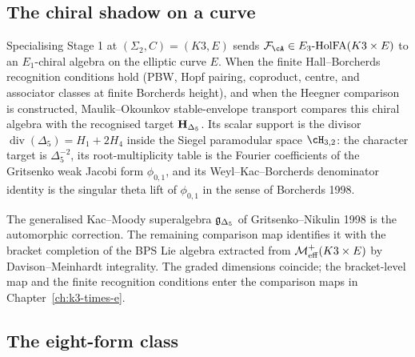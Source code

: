 \subsection{The chiral shadow on a curve}
\label{wn:sec:platonic-intro-chiral-shadow}

Specialising Stage 1 at $(\Sigma_2, C) = (K3, E)$ sends
$\cF_\cA \in E_3\text{-}\HolFA(K3 \times E)$ to an $E_1$-chiral
algebra on the elliptic curve $E$. When the finite Hall--Borcherds
recognition conditions hold (PBW, Hopf pairing, coproduct, centre, and associator
classes at finite Borcherds height), and when the Heegner comparison is
constructed, Maulik--Okounkov stable-envelope transport compares this
chiral algebra with the recognised target $\mathbf{H}_{\Delta_5}$. Its scalar
support is the divisor
$\operatorname{div}(\Delta_5)=H_1+2H_4$ inside the Siegel paramodular
space $\cH_{3,2}$: the character target is $\Delta_5^{-2}$, its
root-multiplicity table is the Fourier coefficients of the Gritsenko
weak Jacobi form $\phi_{0,1}$, and its Weyl--Kac--Borcherds denominator
identity is the singular theta lift of $\phi_{0,1}$ in the sense of
Borcherds 1998.

The generalised Kac--Moody superalgebra $\mathfrak{g}_{\Delta_5}$ of
Gritsenko--Nikulin 1998 is the automorphic correction. The remaining
comparison map identifies it with the bracket completion of the BPS Lie
algebra extracted from $\mathcal{M}^{+}_{\mathrm{eff}}(K3 \times E)$ by Davison--Meinhardt
integrality. The graded dimensions coincide; the bracket-level map and
the finite recognition conditions enter the comparison maps in
Chapter~\ref{ch:k3-times-e}.

\subsection{The eight-form class}
\label{wn:sec:platonic-intro-eight-form}

